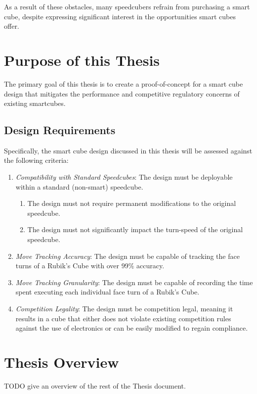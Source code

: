 As a result of these obstacles, many speedcubers refrain from purchasing a smart cube, despite expressing significant interest in the opportunities smart cubes offer.

\section{Purpose of this Thesis}
The primary goal of this thesis is to create a proof-of-concept for a smart cube design that mitigates the performance and competitive regulatory concerns of existing smartcubes.

\subsection{Design Requirements}
Specifically, the smart cube design discussed in this thesis will be assessed against the following criteria:
\begin{enumerate}
    \item \emph{Compatibility with Standard Speedcubes}: The design must be deployable within a standard (non-smart) speedcube.
        \begin{enumerate} 
            \item The design must not require permanent modifications to the original speedcube.
            \item The design must not significantly impact the turn-speed of the original speedcube.
        \end{enumerate}
    \item \emph{Move Tracking Accuracy}: The design must be capable of tracking the face turns of a Rubik's Cube with over 99\% accuracy.
    \item \emph{Move Tracking Granularity}: The design must be capable of recording the time spent executing each individual face turn of a Rubik's Cube.
    \item \emph{Competition Legality}: The design must be competition legal, meaning it results in a cube that either does not violate existing competition rules against the use of electronics or can be easily modified to regain compliance.
\end{enumerate}

\section{Thesis Overview}
TODO give an overview of the rest of the Thesis document.